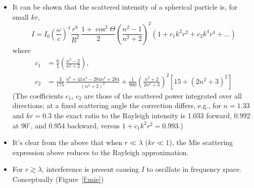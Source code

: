 \documentclass[11pt, oneside]{article}
\begin{document}
\begin{itemize}
	\item It can be shown that the scattered intensity of a spherical particle is, for small $kr$,
	\begin{equation}
		\label{e:Mie}
		\boxed{I = I_0\left(\frac{\omega}{c}\right)^4\frac{r^6}{R^2}\,\frac{1 + \cos^2\Theta}{2}\left(\frac{n^2 - 1}{n^2 + 2}\right)^2\left(1 + c_1k^2r^2 + c_2k^4r^4 + \ldots\right)}
	\end{equation}
	where
	\begin{align}
		c_1 &= \frac{6}{5}\left(\frac{n^2 - 2}{n^2 + 2}\right), \label{e:c1}\\
		c_2 &= \frac{3}{175}\,\frac{n^6 + 41n^4 - 284n^2 + 284}{(n^2 + 2)^2} + \frac{1}{900}\left(\frac{n^2 + 2}{2n^2 + 3}\right)^2\left[15 + (2n^2 + 3)^2\right] \label{e:c2}
	\end{align}
	(The coefficients $c_1$, $c_2$ are those of the scattered power integrated over all directions; at a fixed scattering angle the correction differs, e.g., for $n = 1.33$ and $kr = 0.3$ the exact ratio to the Rayleigh intensity is 1.033 forward, 0.992 at $90^\circ$, and 0.954 backward, versus $1 + c_1k^2r^2 = 0.993$.)
	\item[--] It's clear from the above that when $r \ll \lambda$ ($kr \ll 1$), the Mie scattering expression above reduces to the Rayleigh approximation.
	\item[--] For $r \gtrsim \lambda$, interference is present causing $I$ to oscillate in frequency space. Conceptually (Figure~\ref{f:mie})
\end{itemize}
\end{document}
